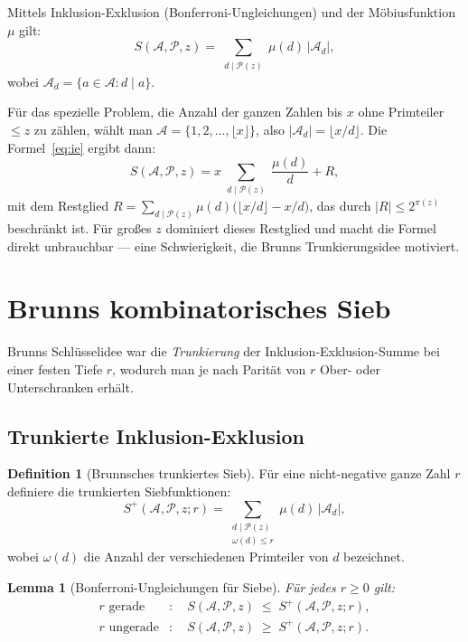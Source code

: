 \documentclass[12pt,a4paper]{amsart}
\newtheorem{lemma}[theorem]{Lemma}
\theoremstyle{definition}
\newtheorem{definition}[theorem]{Definition}
\begin{document}
Mittels Inklusion-Exklusion (Bonferroni-Ungleichungen) und der Möbiusfunktion $\mu$ gilt:
\begin{equation}\label{eq:ie}
  S(\mathcal{A}, \mathcal{P}, z)
  = \sum_{\substack{d \mid \mathcal{P}(z)}} \mu(d)\, |\mathcal{A}_d|,
\end{equation}
wobei $\mathcal{A}_d = \{a \in \mathcal{A} : d \mid a\}$.

Für das spezielle Problem, die Anzahl der ganzen Zahlen bis $x$ ohne Primteiler
$\leq z$ zu zählen, wählt man $\mathcal{A} = \{1, 2, \ldots, \lfloor x \rfloor\}$,
also $|\mathcal{A}_d| = \lfloor x/d \rfloor$.  Die Formel~\eqref{eq:ie} ergibt dann:
\[
  S(\mathcal{A}, \mathcal{P}, z)
  = x \sum_{\substack{d \mid \mathcal{P}(z)}} \frac{\mu(d)}{d}
  + R,
\]
mit dem Restglied $R = \sum_{d \mid \mathcal{P}(z)} \mu(d)\bigl(\lfloor x/d \rfloor - x/d\bigr)$,
das durch $|R| \leq 2^{\pi(z)}$ beschränkt ist.  Für großes $z$ dominiert
dieses Restglied und macht die Formel direkt unbrauchbar --- eine Schwierigkeit,
die Brunns Trunkierungsidee motiviert.

\section{Brunns kombinatorisches Sieb}
\label{sec:sieb}

Brunns Schlüsselidee war die \emph{Trunkierung} der Inklusion-Exklusion-Summe
bei einer festen Tiefe $r$, wodurch man je nach Parität von $r$ Ober- oder
Unterschranken erhält.

\subsection{Trunkierte Inklusion-Exklusion}

\begin{definition}[Brunnsches trunkiertes Sieb]
  Für eine nicht-negative ganze Zahl $r$ definiere die trunkierten Siebfunktionen:
  \[
    S^+(\mathcal{A}, \mathcal{P}, z; r)
    = \sum_{\substack{d \mid \mathcal{P}(z) \\ \omega(d) \leq r}} \mu(d)\, |\mathcal{A}_d|,
  \]
  wobei $\omega(d)$ die Anzahl der verschiedenen Primteiler von $d$ bezeichnet.
\end{definition}

\begin{lemma}[Bonferroni-Ungleichungen für Siebe]\label{lem:bonferroni}
  Für jedes $r \geq 0$ gilt:
  \begin{align*}
    r \text{ gerade} &: \quad S(\mathcal{A}, \mathcal{P}, z) \;\leq\; S^+(\mathcal{A}, \mathcal{P}, z; r), \\
    r \text{ ungerade}  &: \quad S(\mathcal{A}, \mathcal{P}, z) \;\geq\; S^+(\mathcal{A}, \mathcal{P}, z; r).
  \end{align*}
\end{lemma}
\end{document}
